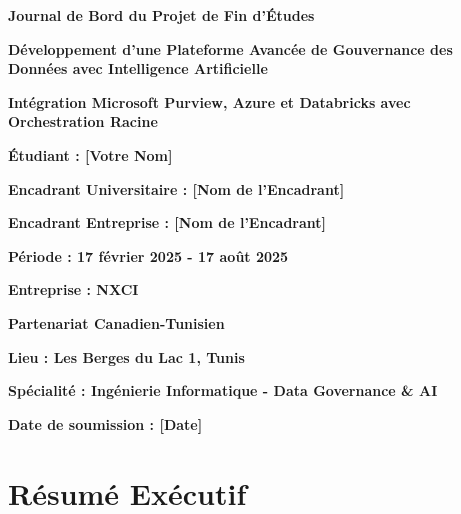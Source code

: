 \documentclass[a4paper,12pt]{article}
\begin{document}
\begin{titlepage}
    \centering
    {\Huge\bfseries Journal de Bord du Projet de Fin d'Études\par}
    \vspace{1.5cm}
    
    {\Large\bfseries Développement d'une Plateforme Avancée de Gouvernance des Données avec Intelligence Artificielle\par}
    \vspace{1cm}
    
    {\large\bfseries Intégration Microsoft Purview, Azure et Databricks avec Orchestration Racine\par}
    \vspace{1.5cm}
    
    {\Large\bfseries Étudiant : [Votre Nom]\par}
    \vspace{0.5cm}
    {\Large\bfseries Encadrant Universitaire : [Nom de l'Encadrant]\par}
    \vspace{0.5cm}
    {\Large\bfseries Encadrant Entreprise : [Nom de l'Encadrant]\par}
    \vspace{0.5cm}
    {\Large\bfseries Période : 17 février 2025 - 17 août 2025\par}
    \vspace{1.5cm}
    
    {\Large\bfseries Entreprise : NXCI\par}
    \vspace{0.5cm}
    {\Large\bfseries Partenariat Canadien-Tunisien\par}
    \vspace{0.5cm}
    {\Large\bfseries Lieu : Les Berges du Lac 1, Tunis\par}
    \vfill
    
    {\large\bfseries Spécialité : Ingénierie Informatique - Data Governance \& AI\par}
    \vspace{0.5cm}
    {\large\bfseries Date de soumission : [Date]\par}
\end{titlepage}

\tableofcontents
\newpage

\section*{Résumé Exécutif}
\end{document}
